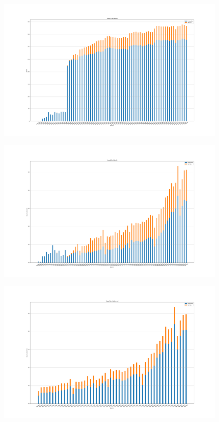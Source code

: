 \documentclass[12pt]{article}
\begin{document}
    \begin{figure}
        \includegraphics[width=\linewidth]{../data/figs/FirmsCount-Whole.png}
    \end{figure}
    \begin{figure}
        \includegraphics[width=\linewidth]{../data/figs/MeanSales-Whole.png}
    \end{figure}
    \begin{figure}
        \includegraphics[width=\linewidth]{../data/figs/MeanSales-Balanced.png}
    \end{figure}
\end{document}
